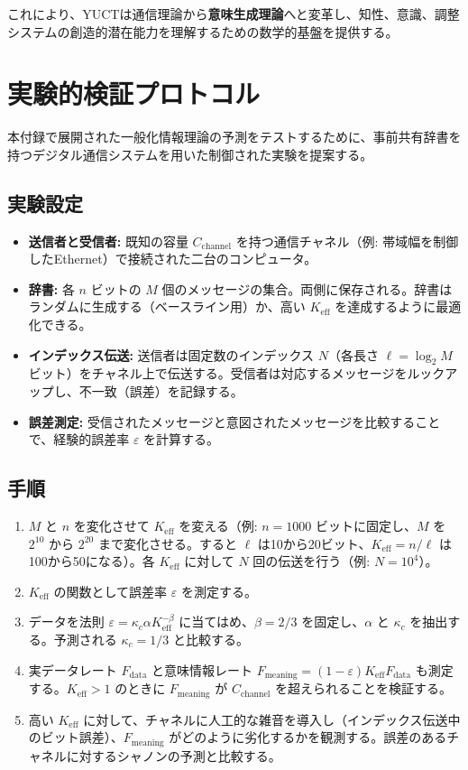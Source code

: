 \documentclass[12pt,a4paper]{article}
\theoremstyle{definition}
\theoremstyle{remark}
\newcommand{\Keff}{K_{\mathrm{eff}}}
\begin{document}
	これにより、YUCTは通信理論から\textbf{意味生成理論}へと変革し、知性、意識、調整システムの創造的潜在能力を理解するための数学的基盤を提供する。
	
	\section{実験的検証プロトコル}
	\label{sec:experiment}
	
	本付録で展開された一般化情報理論の予測をテストするために、事前共有辞書を持つデジタル通信システムを用いた制御された実験を提案する。
	
	\subsection{実験設定}
	
	\begin{itemize}
		\item \textbf{送信者と受信者:} 既知の容量 $C_{\text{channel}}$ を持つ通信チャネル（例: 帯域幅を制御したEthernet）で接続された二台のコンピュータ。
		\item \textbf{辞書:} 各 $n$ ビットの $M$ 個のメッセージの集合。両側に保存される。辞書はランダムに生成する（ベースライン用）か、高い $\Keff$ を達成するように最適化できる。
		\item \textbf{インデックス伝送:} 送信者は固定数のインデックス $N$（各長さ $\ell = \log_2 M$ ビット）をチャネル上で伝送する。受信者は対応するメッセージをルックアップし、不一致（誤差）を記録する。
		\item \textbf{誤差測定:} 受信されたメッセージと意図されたメッセージを比較することで、経験的誤差率 $\varepsilon$ を計算する。
	\end{itemize}
	
	\subsection{手順}
	
	\begin{enumerate}
		\item $M$ と $n$ を変化させて $\Keff$ を変える（例: $n=1000$ ビットに固定し、$M$ を $2^{10}$ から $2^{20}$ まで変化させる。すると $\ell$ は10から20ビット、$\Keff = n/\ell$ は100から50になる）。各 $\Keff$ に対して $N$ 回の伝送を行う（例: $N=10^4$）。
		\item $\Keff$ の関数として誤差率 $\varepsilon$ を測定する。
		\item データを法則 $\varepsilon = \kappa_c \alpha K_{\mathrm{eff}}^{-\beta}$ に当てはめ、$\beta=2/3$ を固定し、$\alpha$ と $\kappa_c$ を抽出する。予測される $\kappa_c=1/3$ と比較する。
		\item 実データレート $F_{\text{data}}$ と意味情報レート $F_{\text{meaning}} = (1-\varepsilon) \Keff F_{\text{data}}$ も測定する。$\Keff>1$ のときに $F_{\text{meaning}}$ が $C_{\text{channel}}$ を超えられることを検証する。
		\item 高い $\Keff$ に対して、チャネルに人工的な雑音を導入し（インデックス伝送中のビット誤差）、$F_{\text{meaning}}$ がどのように劣化するかを観測する。誤差のあるチャネルに対するシャノンの予測と比較する。
	\end{enumerate}
	
\end{document}
